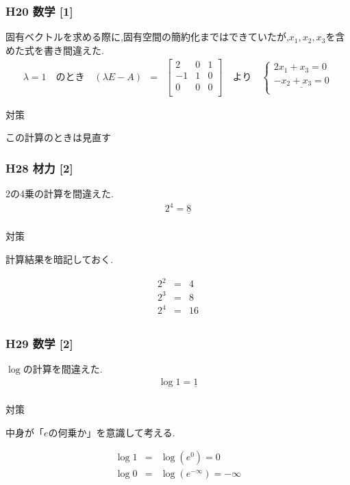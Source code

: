 \documentclass[a4paper]{jsarticle}
\begin{document}
\subsubsection{H20 数学 [1]}
固有ベクトルを求める際に,固有空間の簡約化まではできていたが,$x_1,x_2,x_3$を含めた式を書き間違えた.\\
\begin{eqnarray*}
    \lambda=1\quad のとき\quad
    \left(\lambda E - A\right)
    &=&
    \begin{bmatrix}
        2  & 0 & 1 \\
        -1 & 1 & 0 \\
        0  & 0 & 0 \\
    \end{bmatrix}
    \quad より\quad
    \begin{cases}
        {2x_1+x_3=0}             \\
        {\underline{-x_2+x_3=0}} \\
    \end{cases}
\end{eqnarray*}
\begin{itembox}[l]{対策}
    \begin{center}
        この計算のときは見直す
    \end{center}
\end{itembox}
\subsubsection{H28 材力 [2]}
2の4乗の計算を間違えた.
\begin{eqnarray*}
    2^4=\underline{8}\\
\end{eqnarray*}
\begin{itembox}[l]{対策}
    \begin{center}
        計算結果を暗記しておく.
    \end{center}
    \begin{eqnarray*}
        2^2&=&4\\
        2^3&=&8\\
        2^4&=&16\\
    \end{eqnarray*}
\end{itembox}
\subsubsection{H29 数学 [2]}
$\log$の計算を間違えた.
\begin{eqnarray*}
    \log 1 = \underline{1}\\
\end{eqnarray*}
\begin{itembox}[l]{対策}
    \begin{center}
        中身が「$e$の何乗か」を意識して考える.
    \end{center}
    \begin{eqnarray*}
        \log1&=&\log\left(e^0\right)=0\\
        \log0&=&\log\left(e^{-\infty}\right)=-\infty\\
    \end{eqnarray*}
\end{itembox}
\end{document}
